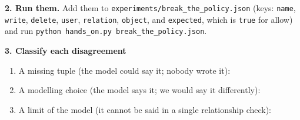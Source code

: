 \documentclass[10pt]{article}
\begin{document}
\bigskip
\textbf{2. Run them.} Add them to \texttt{experiments/break\_the\_policy.json} (keys: \texttt{name}, \texttt{write}, \texttt{delete}, \texttt{user}, \texttt{relation}, \texttt{object}, and \texttt{expected}, which is \texttt{true} for allow) and run \texttt{python hands\_on.py break\_the\_policy.json}.

\bigskip
\textbf{3. Classify each disagreement}

\begin{enumerate}
  \item A missing tuple (the model could say it; nobody wrote it): \blank[6cm]
  \item A modelling choice (the model says it; we would say it differently): \blank[5cm]
  \item A limit of the model (it cannot be said in a single relationship check): \blank[4.5cm]
\end{enumerate}
\end{document}
